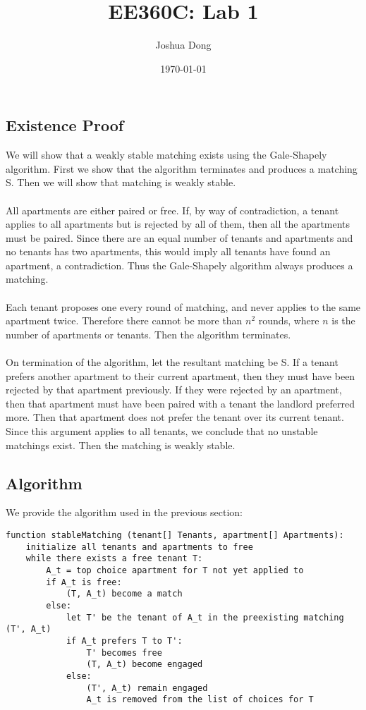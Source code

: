 \documentclass{article}
\begin{document}
\title{EE360C: Lab 1}
\author{Joshua Dong}
\date{\today}
\maketitle

\subsection{Existence Proof}
We will show that a weakly stable matching exists using the Gale-Shapely
algorithm. First we show that the algorithm terminates and produces a
matching S. Then we will show that matching is weakly stable.
\\\\
All apartments are either paired or free. If, by way of contradiction, a
tenant applies to all apartments but is rejected by all of them, then all the
apartments must be paired. Since there are an equal number of tenants and
apartments and no tenants has two apartments, this would imply all tenants
have found an apartment, a contradiction. Thus the Gale-Shapely algorithm
always produces a matching.
\\\\
Each tenant proposes one every round of matching, and never applies to the
same apartment twice. Therefore there cannot be more than $n^2$ rounds, where
$n$ is the number of apartments or tenants. Then the algorithm terminates.
\\\\
On termination of the algorithm, let the resultant matching be S. If a tenant
prefers another apartment to their current apartment, then they must have been
rejected by that apartment previously. If they were rejected by an apartment,
then that apartment must have been paired with a tenant the landlord preferred
more. Then that apartment does not prefer the tenant over its current tenant.
Since this argument applies to all tenants, we conclude that no unstable
matchings exist. Then the matching is weakly stable.


\newpage
\subsection{Algorithm}
We provide the algorithm used in the previous section:

\begin{lstlisting}
function stableMatching (tenant[] Tenants, apartment[] Apartments):
    initialize all tenants and apartments to free
    while there exists a free tenant T:
        A_t = top choice apartment for T not yet applied to
        if A_t is free:
            (T, A_t) become a match
        else:
            let T' be the tenant of A_t in the preexisting matching (T', A_t)
            if A_t prefers T to T':
                T' becomes free
                (T, A_t) become engaged 
            else:
                (T', A_t) remain engaged
                A_t is removed from the list of choices for T
\end{lstlisting}
\end{document}
